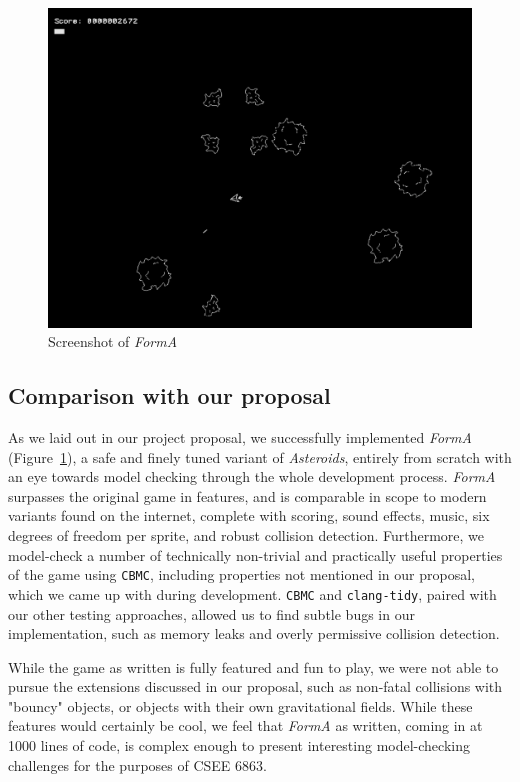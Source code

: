 \documentclass{article}
\newcommand{\Name}{\textit{FormA}\xspace}
\newcommand{\cbmc}{\texttt{CBMC}}
\begin{document}
        \begin{figure}[h!]
            \includegraphics[width=\linewidth]{gameplay.png}
            \caption{Screenshot of \Name{}}
            \label{fig:gameplay}
        \end{figure}

    \subsection{Comparison with our proposal}

        As we laid out in our project proposal, we successfully implemented
        \Name{} (Figure~\ref{fig:gameplay}), a safe and finely tuned variant of
        \textit{Asteroids}, entirely from scratch with an eye towards model
        checking through the whole development process. \Name{} surpasses the
        original game in features, and is comparable in scope to modern variants
        found on the internet, complete with scoring, sound effects, music, six
        degrees of freedom per sprite, and robust collision detection.
        Furthermore, we model-check a number of technically non-trivial and
        practically useful properties of the game using \cbmc{}, including
        properties not mentioned in our proposal, which we came up with during
        development. \cbmc{} and \texttt{clang-tidy}, paired with our other
        testing approaches, allowed us to find subtle bugs in our
        implementation, such as memory leaks and overly permissive collision
        detection.

        While the game as written is fully featured and fun to play, we were not
        able to pursue the extensions discussed in our proposal, such as
        non-fatal collisions with "bouncy" objects, or objects with their own
        gravitational fields. While these features would certainly be cool, we
        feel that \Name{} as written, coming in at 1000 lines of code, is
        complex enough to present interesting model-checking challenges for
        the purposes of CSEE 6863.
\end{document}
